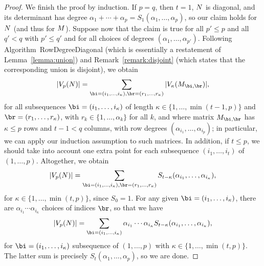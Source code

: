 \documentclass[12pt]{article}
\begin{document}
\begin{proof}
  We finish the proof by induction. If $p=q$, then $t=1$, ${N}$ is diagonal, and
  its determinant has degree $\alpha_1 + \cdots + \alpha_p =
  S_1(\alpha_1,\dots,\alpha_p)$, so our claim holds for ${N}$ (and
  thus for ${M}$). Suppose now that the claim is true  for all $p'\le p$ and all $q' < q$ with $p'
  \le q'$ and for all choices
  of degrees $(\alpha_1,\dots,\alpha_{p'})$. Following Algorithm~{\sf RowDegreeDiagonal}
  (which is essentially a restatement of Lemma~\ref{lemma:union}) and Remark~\ref{remark:disjoint} 
  (which states that the corresponding union is disjoint), we obtain
  $$
  |V_p(\mN)| = \sum_{\bi=(i_1,\dots,i_\kappa),\br=(r_1,\dots,r_\kappa)}  |V_\kappa(\mM_{\bi,\br})|,
  $$ for all subsequences $\bi=(i_1,\dots,i_\kappa)$ of length $\kappa
  \in \{1,\dots,\min(t-1,p)\}$ and $\br=(r_1,\dots,r_\kappa)$, with $r_k
  \in \{1,\dots,\alpha_k\}$ for all $k$, and where 
  matrix $\mM_{\bi,\br}$
  has $\kappa \le p$ rows and $t-1 < q$ columns, with row degrees $(\alpha_{i_1},\dots,\alpha_{i_p})$;
  in particular, we can apply our induction assumption to such matrices.
  In addition, if $t \le p$, we should take into account one extra point 
  for each subsequence $(i_1,\dots,i_t)$ of $(1,\dots,p)$. Altogether, 
  we obtain 
  $$
  |V_p(\mN)| = \sum_{\bi=(i_1,\dots,i_\kappa),\br=(r_1,\dots,r_\kappa)}  S_{t-\kappa}(\alpha_{i_1},\dots,\alpha_{i_\kappa}),
  $$
  for $\kappa \in \{1,\dots,\min(t,p)\}$, since $S_0=1$.
  For any given $\bi=(i_1,\dots,i_\kappa)$, there are $\alpha_{i_1}\cdots \alpha_{i_\kappa}$ 
  choices of indices $\br$, so that we have
  $$
  |V_p(\mN)| = \sum_{\bi=(i_1,\dots,i_\kappa)} \alpha_{i_1}\cdots \alpha_{i_\kappa} S_{t-\kappa}(\alpha_{i_1},\dots,\alpha_{i_\kappa}),
  $$
  for $\bi=(i_1,\dots,i_\kappa)$ subsequence of $(1,\dots,p)$ with $\kappa \in \{1,\dots,\min(t,p)\}$.
  The latter sum is precisely $S_t(\alpha_1,\dots,\alpha_p)$, so we are done.
\end{proof}
\end{document}
